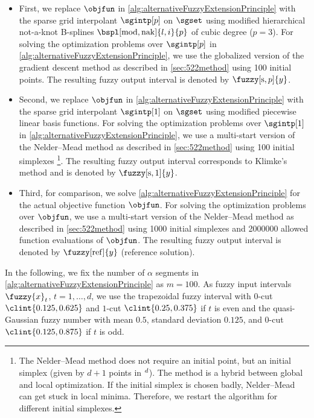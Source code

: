 \begin{itemize}
  \item
  First,
  we replace $\objfun$ in \cref{alg:alternativeFuzzyExtensionPrinciple}
  with the sparse grid interpolant $\sgintp[p]$
  on $\sgset$ using modified hierarchical not-a-knot B-splines
  $\bspl[\modified,\nak]{l,i}{p}$ of cubic degree ($p = 3$).
  For solving the optimization problems over $\sgintp[p]$ in
  \cref{alg:alternativeFuzzyExtensionPrinciple},
  we use the globalized version of the gradient descent method
  as described in \cref{sec:522method} using 100 initial points.
  The resulting fuzzy output interval is denoted by $\fuzzy[\sparse,p]{y}$.
  
  \item
  Second,
  we replace $\objfun$ in \cref{alg:alternativeFuzzyExtensionPrinciple}
  with the sparse grid interpolant $\sgintp[1]$
  on $\sgset$ using modified piecewise linear basis functions.
  For solving the optimization problems over $\sgintp[1]$ in
  \cref{alg:alternativeFuzzyExtensionPrinciple},
  we use a multi-start version of the Nelder--Mead method
  as described in \cref{sec:522method}
  using 100 initial simplexes%
  \footnote{%
    The Nelder--Mead method does not require an initial point,
    but an initial simplex (given by $d + 1$ points in $\real^d$).
    The method is a hybrid between global and local optimization.
    If the initial simplex is chosen badly, Nelder--Mead can get stuck
    in local minima.
    Therefore, we restart the algorithm for different initial simplexes.%
  }.
  The resulting fuzzy output interval corresponds to Klimke's method and
  is denoted by $\fuzzy[\sparse,1]{y}$.
  
  \item
  Third,
  for comparison, we solve
  \cref{alg:alternativeFuzzyExtensionPrinciple} for the
  actual objective function $\objfun$.
  For solving the optimization problems over $\objfun$,
  we use a multi-start version of the Nelder--Mead method
  as described in \cref{sec:522method}
  using 1000 initial simplexes
  and \num{2000000} allowed function evaluations of $\objfun$.
  The resulting fuzzy output interval is denoted by $\fuzzy[\reference]{y}$
  (reference solution).
\end{itemize}

In the following, we fix the number of $\alpha$ segments
in \cref{alg:alternativeFuzzyExtensionPrinciple} as $m = 100$.
As fuzzy input intervals $\fuzzy{x}_t$, $t = 1, \dotsc, d$, we use
the trapezoidal fuzzy interval with $0$-cut $\clint{0.125, 0.625}$
and $1$-cut $\clint{0.25, 0.375}$ if $t$ is even and
the quasi-Gaussian fuzzy number with mean $0.5$, standard deviation $0.125$,
and $0$-cut $\clint{0.125, 0.875}$ if $t$ is odd.

